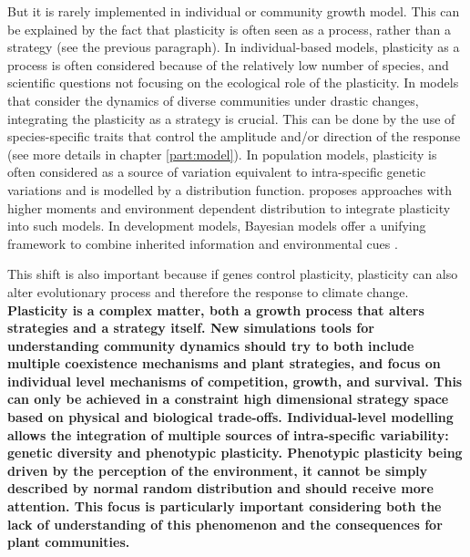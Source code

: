 But it is rarely implemented in individual or community growth model. This can be explained by the fact that plasticity is often seen as a process, rather than a strategy (see the previous paragraph). In individual-based models, plasticity as a process is often considered because of the relatively low number of species, and scientific questions not focusing on the ecological role of the plasticity. In models that consider the dynamics of diverse communities under drastic changes, integrating the plasticity as a strategy is crucial. This can be done by the use of species-specific traits that control the amplitude and/or direction of the response (see more details in chapter \ref{part:model}). In population models, plasticity is often considered as a source of variation equivalent to intra-specific genetic variations and is modelled by a distribution function. \citet{dewitt_expanding_2016} proposes approaches with higher moments and environment dependent distribution to integrate plasticity into such models. In development models, Bayesian models offer a unifying framework to combine inherited information and environmental cues \parencite{stamps_bayesian_2016}.


This shift is also important because if genes control plasticity, plasticity can also alter evolutionary process and therefore the response to climate change\parencite{pfennig_phenotypic_2010, matesanz_global_2010, nicotra_plant_2010}.\\


\textbf{Plasticity is a complex matter, both a growth process that alters strategies and a strategy itself. New simulations tools for understanding community dynamics should try to both include multiple coexistence mechanisms and plant strategies, and focus on individual level mechanisms of competition, growth, and survival. This can only be achieved in a constraint high dimensional strategy space based on physical and biological trade-offs. Individual-level modelling allows the integration of multiple sources of intra-specific variability: genetic diversity and phenotypic plasticity. Phenotypic plasticity being driven by the perception of the environment, it cannot be simply described by normal random distribution and should receive more attention. This focus is particularly important considering both the lack of understanding of this phenomenon and the consequences for plant communities.}


